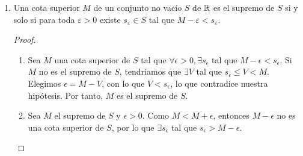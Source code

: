 \begin{enumerate}[label=\roman*)]
 \begin{proof} 
  Supongamos que $m_1$ y $m_2$ son ínfimos de $A$. Como $m_1$ es una cota superior de $A$ y $m_2$ es elemento ínfimo, entonces $m_1\leq m_2$. Similarmente, $m_2\leq m_1$. Por tanto, $m_1=m_2$. 
 \end{proof}

 \item Una cota superior $M$ de un conjunto no vacío $S$ de $\mathbb{R}$ es el supremo de $S$ si y solo si para toda $\varepsilon>0$ existe $s_\varepsilon \in S$ tal que $M-\varepsilon<s_\varepsilon$.

 \begin{proof} 
  \begin{enumerate}[label=\roman*)]
   \item Sea $M$ una cota superior de $S$ tal que $\forall \epsilon>0, \exists s_{\epsilon}$ tal que $M-\epsilon<s_{\epsilon}$. Si $M$ no es el supremo de $S$, tendríamos que $\exists V$ tal que $s_\epsilon \leq V < M$. Elegimos $\epsilon = M-V$, con lo que $V<s_{\epsilon}$, lo que contradice nuestra hipótesis. Por tanto, $M$ es el supremo de $S$.
   \item Sea $M$ el supremo de $S$ y $\epsilon>0$. Como $M<M+\epsilon$, entonces $M-\epsilon$ no es una cota superior de $S$, por lo que $\exists s_\epsilon$ tal que $s_\epsilon>M-\epsilon$. \qedhere
   \end{enumerate} 
 \end{proof}
\end{enumerate}